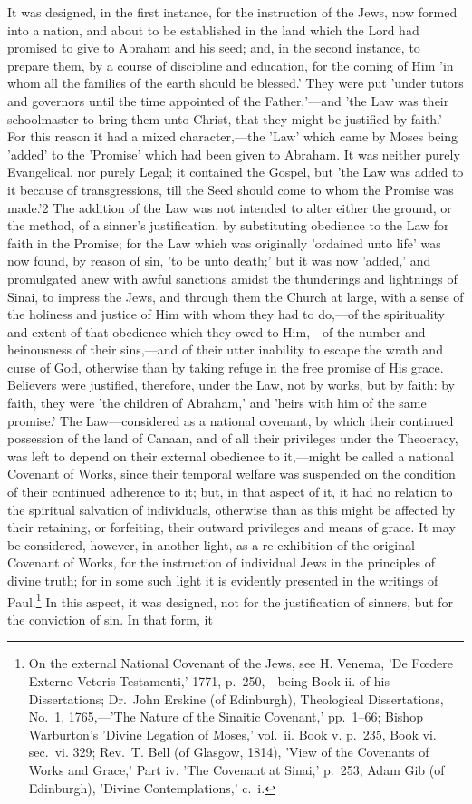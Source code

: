 \documentclass[
]{book}
\begin{document}
It was designed, in the first instance, for the instruction of the Jews, now formed into a nation, and about to be established in the land which the Lord had promised to give to Abraham and his seed; and, in the second instance, to prepare them, by a course of discipline and education, for the coming of Him 'in whom all the families of the earth should be blessed.' They were put 'under tutors and governors until the time appointed of the Father,'---and 'the Law was their schoolmaster to bring them unto Christ, that they might be justified by faith.' For this reason it had a mixed character,---the 'Law' which came by Moses being 'added' to the 'Promise' which had been given to Abraham. It was neither purely Evangelical, nor purely Legal; it contained the Gospel, but 'the Law was added to it because of transgressions, till the Seed should come to whom the Promise was made.'2 The addition of the Law was not intended to alter either the ground, or the method, of a sinner's justification, by substituting obedience to the Law for faith in the Promise; for the Law which was originally 'ordained unto life' was now found, by reason of sin, 'to be unto death;' but it was now 'added,' and promulgated anew with awful sanctions amidst the thunderings and lightnings of Sinai, to impress the Jews, and through them the Church at large, with a sense of the holiness and justice of Him with whom they had to do,---of the spirituality and extent of that obedience which they owed to Him,---of the number and heinousness of their sins,---and of their utter inability to escape the wrath and curse of God, otherwise than by taking refuge in the free promise of His grace. Believers were justified, therefore, under the Law, not by works, but by faith: by faith, they were 'the children of Abraham,' and 'heirs with him of the same promise.' The Law---considered as a national covenant, by which their continued possession of the land of Canaan, and of all their privileges under the Theocracy, was left to depend on their external obedience to it,---might be called a national Covenant of Works, since their temporal welfare was suspended on the condition of their continued adherence to it; but, in that aspect of it, it had no relation to the spiritual salvation of individuals, otherwise than as this might be affected by their retaining, or forfeiting, their outward privileges and means of grace. It may be considered, however, in another light, as a re-exhibition of the original Covenant of Works, for the instruction of individual Jews in the principles of divine truth; for in some such light it is evidently presented in the writings of Paul.\footnote{On the external National Covenant of the Jews, see H. Venema, 'De Fœdere Externo Veteris Testamenti,' 1771, p.~250,---being Book ii. of his Dissertations; Dr.~John Erskine (of Edinburgh), Theological Dissertations, No.~1, 1765,---'The Nature of the Sinaitic Covenant,' pp.~1--66; Bishop Warburton's 'Divine Legation of Moses,' vol.~ii. Book v. p.~235, Book vi. sec.~vi. 329; Rev.~T. Bell (of Glasgow, 1814), 'View of the Covenants of Works and Grace,' Part iv. 'The Covenant at Sinai,' p.~253; Adam Gib (of Edinburgh), 'Divine Contemplations,' c.~i.} In this aspect, it was designed, not for the justification of sinners, but for the conviction of sin. In that form, it 
\end{document}
